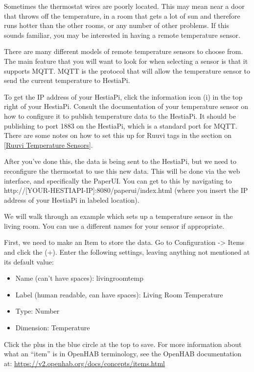 Sometimes the thermostat wires are poorly located. This may mean near a door
that throws off the temperature, in a room that gets a lot of sun and therefore
runs hotter than the other rooms, or any number of other problems. If this
sounds familiar, you may be interested in having a remote temperature sensor.

There are many different models of remote temperature sensors to choose from.
The main feature that you will want to look for when selecting a sensor is that
it supports MQTT. MQTT is the protocol that will allow the temperature sensor
to send the current temperature to HestiaPi.

To get the IP address of your HestiaPi, click the information icon (i) in the
top right of your HestiaPi. Consult the documentation of your temperature
sensor on how to configure it to publish temperature data to the HestiaPi. It
should be publishing to port 1883 on the HestiaPi, which is a standard port for
MQTT. There are some notes on how to set this up for Ruuvi tags in the section
on \ref{Ruuvi Temperature Sensors}.

After you've done this, the data is being sent to the HestiaPi, but we need to
reconfigure the thermostat to use this new data. This will be done via the web
interface, and specifically the PaperUI. You can get to this by navigating to
http://[YOUR-HESTIAPI-IP]:8080/paperui/index.html (where you insert the IP address of your
HestiaPi in labeled location).

We will walk through an example which sets up a temperature sensor in the living
room. You can use a different names for your sensor if appropriate.

First, we need to make an Item to store the data. Go to Configuration -> Items
and click the (+).  Enter the following settings, leaving anything not mentioned
at its default value:

\begin{itemize}
\item Name (can’t have spaces): livingroomtemp
\item Label (human readable, can have spaces): Living Room Temperature
\item Type: Number
\item Dimension: Temperature
\end{itemize} 

Click the plus in the blue circle at the top to save. For more information
about what an ``item'' is in OpenHAB terminology, see the OpenHAB documentation
at: \url{https://v2.openhab.org/docs/concepts/items.html}

